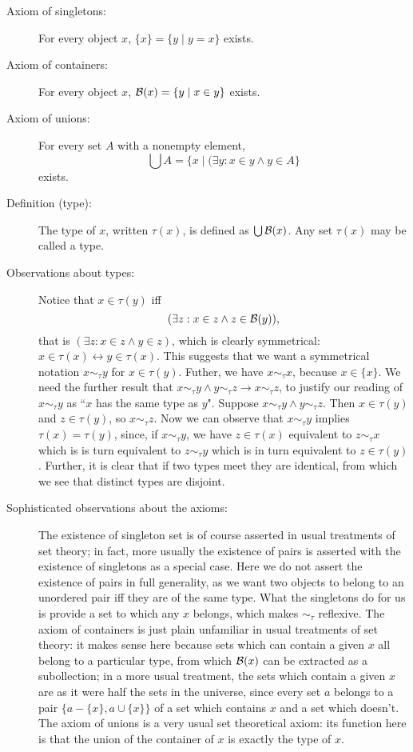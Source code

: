 \documentclass[12pt]{book}
\begin{document}
\begin{description}

\item[Axiom of singletons:]   For every object $x$, $\{x\} = \{y\mid y = x\}$ exists.

\item[Axiom of containers:]  For every object $x$, ${\cal B}(x) = \{y \mid x \in y\}$ exists.

\item[Axiom of unions:]  For every set $A$ with a nonempty element, $$\bigcup A = \{x\mid (\exists y:x \in y \wedge y \in A\}$$ exists.



\item[Definition (type):]  The type of $x$, written $\tau(x)$, is defined as $\bigcup {\cal B}(x)$.  Any set $\tau(x)$ may be called a type.

\item[Observations about types:]  Notice that $x \in \tau(y)$ iff $$(\exists z:x \in z \wedge z \in {\cal B}(y)),$$ that is $(\exists z:x \in z \wedge y \in z)$, which is clearly symmetrical:
$x \in \tau(x) \leftrightarrow y \in \tau(x)$.  This suggests that we want a symmetrical notation $x \sim_{\tau} y$ for $x \in \tau(y)$.  Futher, we have $x \sim_{\tau} x$, because $x \in \{x\}$.  We need the further result that $x \sim_{\tau} y \wedge y \sim_{\tau} z \rightarrow x \sim_{\tau} z$, to justify our reading  of $x \sim_{\tau} y$ as ``$x$ has the same type as $y$".  Suppose $x \sim_{\tau} y \wedge y \sim_{\tau} z$.  Then $x \in \tau(y)$ and $z \in \tau(y)$, so $x \sim_\tau z$.   Now we can observe that $x \sim_\tau y$ implies $\tau(x) = \tau(y)$, since, if $x \sim_\tau y$, we have $z \in \tau(x)$ equivalent to $z \sim_\tau x$ which is is turn equivalent to $z \sim_\tau y$ which is in turn equivalent to $z \in \tau(y)$.  Further, it is clear that if two types meet they are identical, from which we see that distinct types are disjoint.

\item[Sophisticated observations about the axioms:]  The existence of singleton set is of course asserted in usual treatments of set theory;  in fact, more usually the existence of pairs is asserted with the existence of singletons as a special case.  Here we do not assert the existence of pairs in full generality, as we want two objects to belong to an unordered pair iff they are of the same type.  What the singletons do for us is provide a set to which any $x$ belongs, which makes $\sim_\tau$ reflexive.  The axiom of containers is just plain unfamiliar in usual treatments of set theory:  it makes sense here because sets
which can contain a given $x$ all belong to a particular type, from which ${\cal B}(x)$ can be extracted as a subollection;  in a more usual treatment, the sets which contain a given $x$ are as it were half the sets in the universe, since every set $a$ belongs to a pair $\{a -\{x\},a \cup \{x\}\}$ of a set which contains $x$ and a set which doesn't.  The axiom of unions is a very usual set theoretical axiom:  its function here is that the union of the container of $x$ is exactly the type of $x$.

\end{description}
\end{document}
